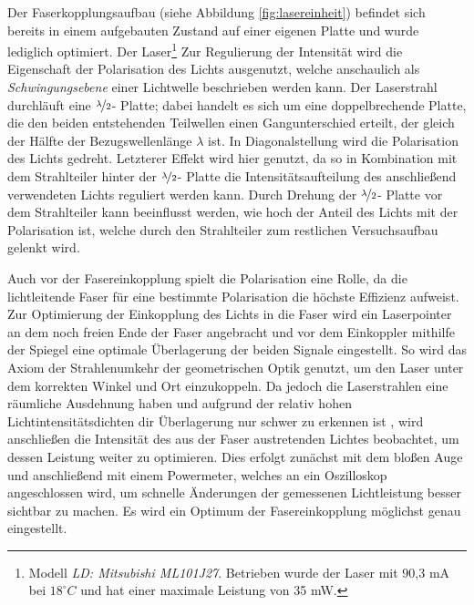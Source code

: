 Der Faserkopplungsaufbau (siehe Abbildung \ref{fig:lasereinheit}) befindet sich bereits in einem aufgebauten Zustand auf einer eigenen Platte und wurde lediglich optimiert. Der Laser\footnote{Modell  \textit{LD: Mitsubishi ML101J27}. Betrieben wurde der Laser mit 90,3 mA bei $18^\circ C$ und hat einer maximale Leistung von 35 mW.} Zur Regulierung der Intensität wird die Eigenschaft der Polarisation des Lichts ausgenutzt, welche anschaulich als \textit{Schwingungsebene} einer Lichtwelle beschrieben werden kann. Der Laserstrahl durchläuft eine $\nicefrac{\lambda}{2}$- Platte; dabei handelt es sich um eine doppelbrechende Platte, die den beiden entstehenden Teilwellen einen Gangunterschied erteilt, der gleich der Hälfte der Bezugswellenlänge $\lambda$ ist. In Diagonalstellung wird die Polarisation des Lichts gedreht. Letzterer Effekt wird hier genutzt, da so in Kombination mit dem Strahlteiler hinter der  $\nicefrac{\lambda}{2}$- Platte die Intensitätsaufteilung des anschließend verwendeten Lichts reguliert werden kann. Durch Drehung der  $\nicefrac{\lambda}{2}$- Platte vor dem Strahlteiler kann beeinflusst werden, wie hoch der Anteil des Lichts mit der Polarisation ist, welche durch den Strahlteiler zum restlichen Versuchsaufbau gelenkt wird.

Auch vor der Fasereinkopplung spielt die Polarisation eine Rolle, da die lichtleitende Faser für eine bestimmte Polarisation die höchste Effizienz aufweist. \\

Zur Optimierung der Einkopplung des Lichts in die Faser wird ein Laserpointer an dem noch freien Ende der Faser angebracht und vor dem Einkoppler mithilfe der Spiegel eine optimale Überlagerung der beiden Signale eingestellt. So wird das Axiom der Strahlenumkehr der geometrischen Optik genutzt, um den Laser unter dem korrekten Winkel und Ort einzukoppeln. Da jedoch die Laserstrahlen eine räumliche Ausdehnung haben und aufgrund der relativ hohen Lichtintensitätsdichten dir Überlagerung nur schwer zu erkennen ist , wird anschließen die Intensität des aus der Faser austretenden Lichtes beobachtet, um dessen Leistung weiter zu optimieren. Dies erfolgt zunächst mit dem bloßen Auge und anschließend mit einem Powermeter, welches an ein Oszilloskop angeschlossen wird, um schnelle Änderungen der gemessenen Lichtleistung besser sichtbar zu machen. Es wird ein Optimum der Fasereinkopplung möglichst genau eingestellt. 

